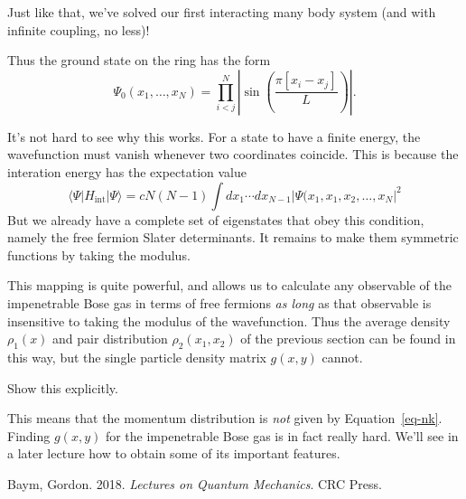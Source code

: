 \documentclass[
  a4paper,
]{scrbook}
\newlength{\cslhangindent}
\newenvironment{CSLReferences}[2] %
 {\begin{list}{}{%
  \setlength{\itemindent}{0pt}
  \setlength{\leftmargin}{0pt}
  \setlength{\parsep}{0pt}
  \ifodd #1
   \setlength{\leftmargin}{\cslhangindent}
   \setlength{\itemindent}{-1\cslhangindent}
  \fi
  \setlength{\itemsep}{#2\baselineskip}}}
 {\end{list}}
\begin{document}
Just like that, we've solved our first interacting many body system (and
with infinite coupling, no less)!

Thus the ground state on the ring has the form \[
\Psi_0(x_1,\ldots, x_N) = \prod_{i<j}^{N} \left|\sin\left(\frac{\pi[x_{i}-x_{j}]}{L}\right)\right|.
\]

It's not hard to see why this works. For a state to have a finite
energy, the wavefunction must vanish whenever two coordinates coincide.
This is because the interation energy has the expectation value \[
\langle{\Psi}\rvert H_\text{int} \lvert \Psi \rangle=cN(N-1)\int dx_1\cdots dx_{N-1}\left|
\Psi(x_1,x_1,x_2,\ldots,x_N\right|^2
\] But we already have a complete set of eigenstates that obey this
condition, namely the free fermion Slater determinants. It remains to
make them symmetric functions by taking the modulus.

This mapping is quite powerful, and allows us to calculate any
observable of the impenetrable Bose gas in terms of free fermions
\emph{as long} as that observable is insensitive to taking the modulus
of the wavefunction. Thus the average density \(\rho_1(x)\) and pair
distribution \(\rho_2(x_1,x_2)\) of the previous section can be found in
this way, but the single particle density matrix \(g(x,y)\) cannot.

\begin{tcolorbox}[enhanced jigsaw, rightrule=.15mm, opacityback=0, bottomtitle=1mm, colbacktitle=quarto-callout-tip-color!10!white, colback=white, toprule=.15mm, titlerule=0mm, arc=.35mm, title=\textcolor{quarto-callout-tip-color}{\faLightbulb}\hspace{0.5em}{Check}, left=2mm, opacitybacktitle=0.6, breakable, leftrule=.75mm, bottomrule=.15mm, colframe=quarto-callout-tip-color-frame, toptitle=1mm, coltitle=black]

Show this explicitly.

\end{tcolorbox}

This means that the momentum distribution is \emph{not} given by
Equation~\ref{eq-nk}. Finding \(g(x,y)\) for the impenetrable Bose gas
is in fact really hard. We'll see in a later lecture how to obtain some
of its important features.

\label{refs}
\begin{CSLReferences}{1}{0}
Baym, Gordon. 2018. \emph{Lectures on Quantum Mechanics}. CRC Press.

\end{CSLReferences}


\backmatter
\end{document}
